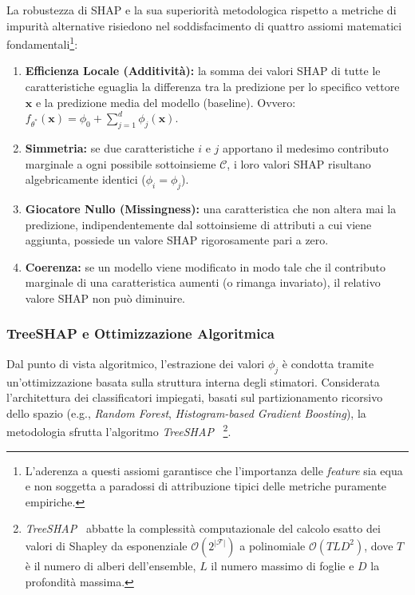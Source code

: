 La robustezza di SHAP e la sua superiorità metodologica rispetto a metriche di impurità alternative risiedono nel soddisfacimento di quattro assiomi matematici fondamentali\footnote{L'aderenza a questi assiomi garantisce che l'importanza delle \textit{feature} sia equa e non soggetta a paradossi di attribuzione tipici delle metriche puramente empiriche.}:
\begin{enumerate}
    \item \textbf{Efficienza Locale (Additività):} la somma dei valori SHAP di tutte le caratteristiche eguaglia la differenza tra la predizione per lo specifico vettore $\mathbf{x}$ e la predizione media del modello (baseline). Ovvero: $f_{\theta^*}(\mathbf{x}) = \phi_0 + \sum_{j=1}^{d} \phi_j(\mathbf{x})$.
    \item \textbf{Simmetria:} se due caratteristiche $i$ e $j$ apportano il medesimo contributo marginale a ogni possibile sottoinsieme $\mathcal{C}$, i loro valori SHAP risultano algebricamente identici ($\phi_i = \phi_j$).
    \item \textbf{Giocatore Nullo (Missingness):} una caratteristica che non altera mai la predizione, indipendentemente dal sottoinsieme di attributi a cui viene aggiunta, possiede un valore SHAP rigorosamente pari a zero.
    \item \textbf{Coerenza:} se un modello viene modificato in modo tale che il contributo marginale di una caratteristica aumenti (o rimanga invariato), il relativo valore SHAP non può diminuire.
\end{enumerate}

\subsubsection{TreeSHAP e Ottimizzazione Algoritmica}
\label{subsubsec:treeshap}

Dal punto di vista algoritmico, l'estrazione dei valori $\phi_j$ è condotta tramite un'ottimizzazione basata sulla struttura interna degli stimatori. Considerata l'architettura dei classificatori impiegati, basati sul partizionamento ricorsivo dello spazio (e.g., \textit{Random Forest}, \textit{Histogram-based Gradient Boosting}), la metodologia sfrutta l'algoritmo \textit{TreeSHAP}~\cite{lundberg2019} \footnote{\textit{TreeSHAP}~\cite{lundberg2019} abbatte la complessità computazionale del calcolo esatto dei valori di Shapley da esponenziale $\mathcal{O}(2^{|\mathcal{F}|})$ a polinomiale $\mathcal{O}(T L D^2)$, dove $T$ è il numero di alberi dell'ensemble, $L$ il numero massimo di foglie e $D$ la profondità massima.}.

